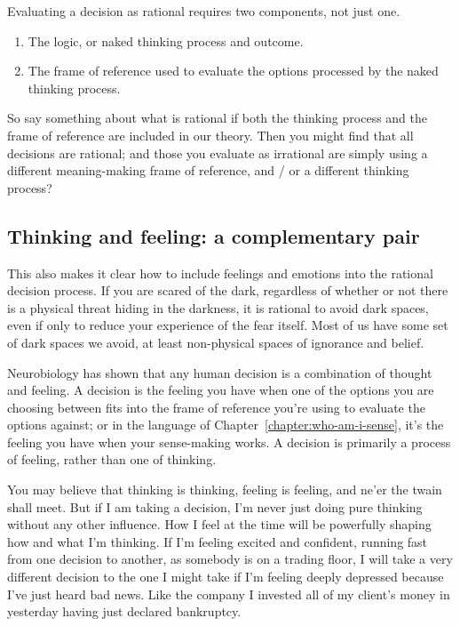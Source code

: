 Evaluating a decision as rational requires two components, not just one. 


\begin{enumerate}
\item The logic, or naked thinking process and outcome. 
\item The frame of reference used to evaluate the options processed by the naked thinking process. 
\end{enumerate}


So say something about what is rational if both the thinking process and the frame of reference are included in our theory. Then you might find that all decisions are rational; and those you evaluate as irrational are simply using a different meaning-making frame of reference, and / or a different thinking process? 


\subsection{Thinking and feeling: a complementary pair}
This also makes it clear how to include feelings and emotions into the rational decision process. If you are scared of the dark, regardless of whether or not there is a physical threat hiding in the darkness, it is rational to avoid dark spaces, even if only to reduce your experience of the fear itself. Most of us have some set of dark spaces we avoid, at least non-physical spaces of ignorance and belief.


Neurobiology has shown that any human decision is a combination of thought and feeling. A decision is the feeling you have when one of the options you are choosing between fits into the frame of reference you're using to evaluate the options against; or in the language of Chapter~\ref{chapter:who-am-i-sense}, it's the feeling you have when your sense-making works. A decision is primarily a process of feeling, rather than one of thinking.


You may believe that thinking is thinking, feeling is feeling, and ne'er the twain shall meet.  
But if I am taking a decision,   I'm never just doing pure thinking without any other influence. How I feel at the time will be powerfully shaping how and what I'm thinking. If I'm feeling excited and confident, running fast from one decision to another, as somebody is on a trading floor, I will take a very different decision to the one I might take if I'm feeling deeply depressed because I've just heard bad news. Like the company I invested all of my client’s money in yesterday having just declared bankruptcy.


